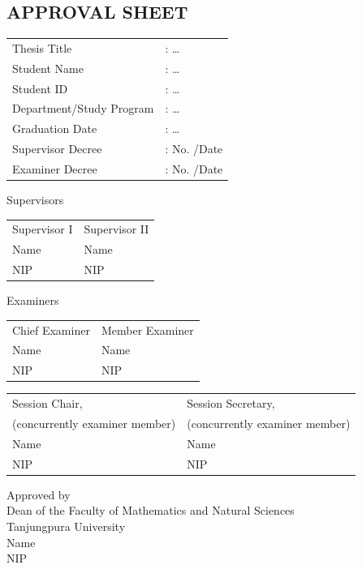 \begin{singlespace}
\chapter*{APPROVAL SHEET}
\thispagestyle{empty}
\noindent
\begin{tabular}{@{}ll}
Thesis Title & : \dots \\
Student Name & : \dots \\
Student ID & : \dots \\
Department/Study Program & : \dots \\
Graduation Date & : \dots \\
Supervisor Decree & : No. \hspace{3cm} /Date \\
Examiner Decree & : No. \hspace{3cm} /Date \\
\end{tabular}\par
\vspace{0.5cm}
{\centering Supervisors \par}
\noindent
\begin{tabular}{@{}p{}p{}@{}}
\centering Supervisor I & \centering Supervisor II \tabularnewline[1.5cm]
\centering Name & \centering Name \tabularnewline
\centering NIP & \centering NIP \tabularnewline
\end{tabular}

\vspace{0.5cm}
{\centering Examiners \par}
\noindent
\begin{tabular}{@{}p{}p{}@{}}
\centering Chief Examiner & \centering Member Examiner \tabularnewline[1.5cm]
\centering Name & \centering Name \tabularnewline
\centering NIP & \centering NIP \tabularnewline
\end{tabular}

\vspace{0.5cm}
\noindent
\begin{tabular}{@{}p{}p{}@{}}
\centering Session Chair, & \centering Session Secretary, \tabularnewline
\centering (concurrently examiner member) & \centering (concurrently examiner member) \tabularnewline[1.5cm]
\centering Name & \centering Name \tabularnewline
\centering NIP & \centering NIP \tabularnewline
\end{tabular}

\vspace{0.5cm}
{\centering
Approved by \\
Dean of the Faculty of Mathematics and Natural Sciences \\
Tanjungpura University \\[1.5cm]
Name \\
NIP \par}
\end{singlespace}
